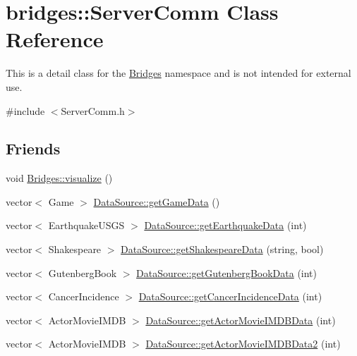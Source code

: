 \hypertarget{classbridges_1_1_server_comm}{}\section{bridges\+:\+:Server\+Comm Class Reference}
\label{classbridges_1_1_server_comm}


This is a detail class for the \mbox{\hyperlink{namespacebridges_1_1_bridges}{Bridges}} namespace and is not intended for external use.  




{\ttfamily \#include $<$Server\+Comm.\+h$>$}

\subsection*{Friends}
\begin{DoxyCompactItemize}
\item 
void \mbox{\hyperlink{classbridges_1_1_server_comm_a0a9e3be9faab475909293766dcda4779}{Bridges\+::visualize}} ()
\item 
vector$<$ Game $>$ \mbox{\hyperlink{classbridges_1_1_server_comm_aaf9715981dcd976f93624bd3aa22183f}{Data\+Source\+::get\+Game\+Data}} ()
\item 
vector$<$ Earthquake\+U\+S\+GS $>$ \mbox{\hyperlink{classbridges_1_1_server_comm_a29b51cd765158c2022cdf624302a6f41}{Data\+Source\+::get\+Earthquake\+Data}} (int)
\item 
vector$<$ Shakespeare $>$ \mbox{\hyperlink{classbridges_1_1_server_comm_a1f240eea3d39812606c0b3d10bdc757c}{Data\+Source\+::get\+Shakespeare\+Data}} (string, bool)
\item 
vector$<$ Gutenberg\+Book $>$ \mbox{\hyperlink{classbridges_1_1_server_comm_a8daad6bf2db8bf4f0b0f9914022b6aa4}{Data\+Source\+::get\+Gutenberg\+Book\+Data}} (int)
\item 
vector$<$ Cancer\+Incidence $>$ \mbox{\hyperlink{classbridges_1_1_server_comm_a206da9499372409063d2abe5d1e9bce0}{Data\+Source\+::get\+Cancer\+Incidence\+Data}} (int)
\item 
vector$<$ Actor\+Movie\+I\+M\+DB $>$ \mbox{\hyperlink{classbridges_1_1_server_comm_aeea4f9e05ded118d657ac8ba9e66f22d}{Data\+Source\+::get\+Actor\+Movie\+I\+M\+D\+B\+Data}} (int)
\item 
vector$<$ Actor\+Movie\+I\+M\+DB $>$ \mbox{\hyperlink{classbridges_1_1_server_comm_a9f693b301b5f883a818914b1f0a8c20f}{Data\+Source\+::get\+Actor\+Movie\+I\+M\+D\+B\+Data2}} (int)
\end{DoxyCompactItemize}


